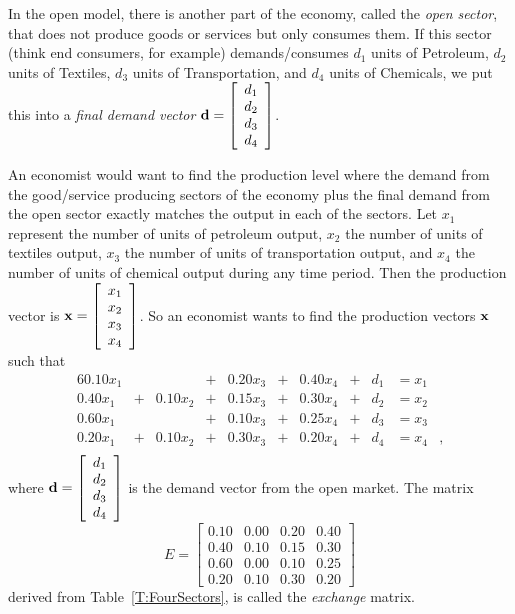 In the open model, there is another part of the economy, called the \emph{open sector}, that does not produce goods or services but only consumes them. If this sector (think end consumers, for example) demands/consumes $d_1$ units of Petroleum, $d_2$ units of Textiles, $d_3$ units of Transportation, and $d_4$ units of Chemicals, we put this into a \emph{final demand vector} $\mathbf{d} = \left[ \begin{array}{c} d_1 \\d_2 \\ d_3 \\ d_4 \end{array}\right]$.

An economist would want to find the production level where the demand from the good/service producing sectors of the economy plus the final demand from the open sector exactly matches the output in each of the sectors. Let $x_1$ represent the number of units of petroleum output, $x_2$ the number of units of textiles output, $x_3$ the number of units of transportation output, and $x_4$ the number of units of chemical output during any time period. Then the production vector is $\mathbf{x} = \left[\begin{array}{c} x_1 \\ x_2 \\ x_3 \\x_4\end{array}\right]$. So an economist wants to find the production vectors $\mathbf{x}$ such that
\begin{alignat*}{6}
{0.10}x_1		&{}{}	&{}				&{}+{}	&{0.20}x_3 &{}+{}	&{0.40}x_4 &{}+{}	&{}d_1	&= x_1&{}   \\
{0.40}x_1		&{}+{}	&{0.10}x_2		&{}+{}	&{0.15}x_3 &{}+{}	&{0.30}x_4 &{}+{}	&{}d_2	&= x_2&{}   \\
{0.60}x_1		&{}{}	&{}				&{}+{}	&{0.10}x_3 &{}+{}	&{0.25}x_4 &{}+{}	&{}d_3	&= x_3&{}   \\
{0.20}x_1		&{}+{}	&{0.10}x_2		&{}+{}	&{0.30}x_3 &{}+{}	&{0.20}x_4 &{}+{}	&{}d_4	&= x_4&{,}   \\
\end{alignat*}
where $\mathbf{d} = \left[ \begin{array}{c} d_1 \\d_2 \\ d_3 \\ d_4 \end{array}\right]$ is the demand vector from the open market.  The matrix 
\[E = \left[ \begin{array}{cccc} 0.10 &0.00 &0.20 &0.40    \\ 0.40  &0.10 &0.15 & 0.30    \\ 0.60 &0.00 &0.10 &0.25 \\  0.20 &0.10 &0.30 &0.20\end{array} \right]\]
derived from Table~\ref{T:FourSectors}, is called the \emph{exchange} matrix.




